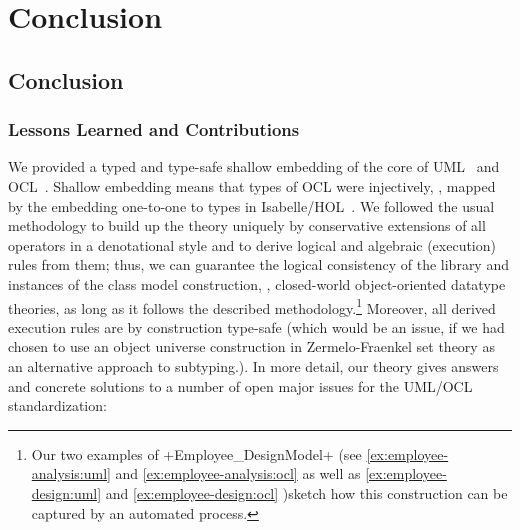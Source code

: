 \part{Conclusion}

\chapter{Conclusion}

\section{Lessons Learned and Contributions}
We provided a typed and type-safe shallow embedding of the core of
UML~\cite{omg:uml-infrastructure:2011,omg:uml-superstructure:2011} and
OCL~\cite{omg:ocl:2012}. Shallow embedding means that types of OCL
were injectively, \ie, mapped by the embedding one-to-one to types in
Isabelle/HOL~\cite{nipkow.ea:isabelle:2002}.  We followed the usual
methodology to build up the theory uniquely by conservative extensions
of all operators in a denotational style and to derive logical and
algebraic (execution) rules from them; thus, we can guarantee the
logical consistency of the library and instances of the class model
construction, \ie, closed-world object-oriented datatype theories, as
long as it follows the described methodology.\footnote{Our two
  examples of \inlineisar+Employee_DesignModel+ (see
  \autoref{ex:employee-analysis:uml} and
  \autoref{ex:employee-analysis:ocl} as well as
  \autoref{ex:employee-design:uml} and
  \autoref{ex:employee-design:ocl} )sketch how this construction can
  be captured by an automated process.}  Moreover, all derived
execution rules are by construction type-safe (which would be an
issue, if we had chosen to use an object universe construction in
Zermelo-Fraenkel set theory as an alternative approach to subtyping.).
In more detail, our theory gives answers and concrete solutions to a
number of open major issues for the UML/OCL standardization:
